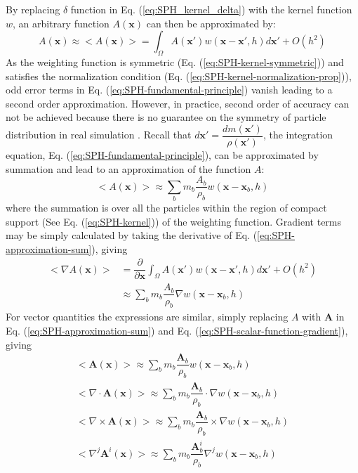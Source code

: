 By replacing $\delta$ function in Eq. (\ref{eq:SPH_kernel_delta}) with the kernel function $w$, an arbitrary function $A\left(\textbf{x}\right)$ can then be approximated by:
\begin{equation}
A\left(\textbf{x}\right) \approx <A\left(\textbf{x}\right)> = \int_{\Omega} A\left(\textbf{x} \prime\right) w\left(\textbf{x}-\textbf{x}\prime, h\right) d\textbf{x}\prime + O\left(h^2\right)
\label{eq:SPH-fundamental-principle}
\end{equation}
As the weighting function is symmetric (Eq. (\ref{eq:SPH-kernel-symmetric})) and satisfies the normalization condition (Eq. (\ref{eq:SPH-kernel-normalization-prop})), odd error terms in Eq. (\ref{eq:SPH-fundamental-principle}) vanish leading to a second order approximation. However, in practice, second order of accuracy can not be achieved because there is no guarantee on the symmetry of particle distribution in real simulation \citep{price2012smoothed}.
Recall that $d\textbf{x}\prime = \dfrac{dm (\textbf{x} \prime)}{\rho (\textbf{x} \prime)}$, the integration equation, Eq. (\ref{eq:SPH-fundamental-principle}), can be approximated by summation and lead to an approximation of the function $A$:
\begin{equation}
<A\left(\textbf{x}\right)> \approx \sum_b m_b \dfrac{A_b}{\rho_b} w\left(\textbf{x}-\textbf{x}_b, h\right)
\label{eq:SPH-approximation-sum}
\end{equation}
where the summation is over all the particles within the region of compact support (See Eq. (\ref{eq:SPH-kernel})) of the weighting function. 
Gradient terms may be simply calculated by taking the derivative of Eq. (\ref{eq:SPH-approximation-sum}), giving
\begin{equation}
\begin{split}
<\nabla A\left(\textbf{x}\right)> & = \dfrac{\partial }{\partial \textbf{x}} \int_{\Omega} A\left(\textbf{x} \prime\right) w\left(\textbf{x}-\textbf{x}\prime, h\right) d\textbf{x}\prime + O\left(h^2\right) \\
& \approx \sum_b m_b \dfrac{A_b}{\rho_b} \nabla w\left(\textbf{x} - \textbf{x}_b, h\right)
\end{split} 
\label{eq:SPH-scalar-function-gradient}
\end{equation}
For vector quantities the expressions are similar, simply replacing $A$ with $\textbf{A}$ in Eq. (\ref{eq:SPH-approximation-sum}) and Eq. (\ref{eq:SPH-scalar-function-gradient}), giving
\begin{align}
<\textbf{A}\left(\textbf{x}\right)> \approx \sum_b m_b \dfrac{\textbf{A}_b}{\rho_b} w\left(\textbf{x}-\textbf{x}_b, h\right) \\
<\nabla \cdot \textbf{A}\left(\textbf{x}\right)> \approx \sum_b m_b \dfrac{\textbf{A}_b}{\rho_b} \cdot \nabla w\left(\textbf{x} - \textbf{x}_b, h\right) \\
<\nabla \times \textbf{A}\left(\textbf{x}\right)> \approx \sum_b m_b \dfrac{\textbf{A}_b}{\rho_b} \times \nabla w\left(\textbf{x} - \textbf{x}_b, h\right) \\
<\nabla^j \textbf{A}^i\left(\textbf{x}\right)> \approx \sum_b m_b \dfrac{\textbf{A}_b^i}{\rho_b} \nabla^j w\left(\textbf{x} - \textbf{x}_b, h\right) 
\label{eq:SPH-vecctor-function}
\end{align}

